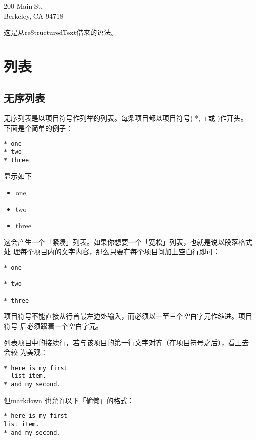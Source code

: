 \documentclass[cn]{elegantbook}
\providecommand{\tightlist}{%
  \setlength{\itemsep}{0pt}\setlength{\parskip}{0pt}}
\begin{document}
200 Main St.\\
Berkeley, CA 94718

这是从reStructuredText借来的语法。

\hypertarget{ux5217ux8868}{%
\section{列表}\label{ux5217ux8868}}

\hypertarget{ux65e0ux5e8fux5217ux8868}{%
\subsection{无序列表}\label{ux65e0ux5e8fux5217ux8868}}

无序列表是以项目符号作列举的列表。每条项目都以项目符号( *, +或-)作开头。
下面是个简单的例子：

\begin{lstlisting}
* one
* two
* three
\end{lstlisting}

显示如下

\begin{itemize}
\tightlist
\item
  one
\item
  two
\item
  three
\end{itemize}

这会产生一个「紧凑」列表。如果你想要一个「宽松」列表，也就是说以段落格式处
理每个项目内的文字内容，那么只要在每个项目间加上空白行即可：

\begin{lstlisting}
* one

* two

* three
\end{lstlisting}

项目符号不能直接从行首最左边处输入，而必须以一至三个空白字元作缩进。项目符号
后必须跟着一个空白字元。

列表项目中的接续行，若与该项目的第一行文字对齐（在项目符号之后），看上去会较
为美观：

\begin{lstlisting}
* here is my first
  list item.
* and my second.
\end{lstlisting}

但markdown 也允许以下「偷懒」的格式：

\begin{lstlisting}
* here is my first
list item.
* and my second.
\end{lstlisting}
\end{document}
